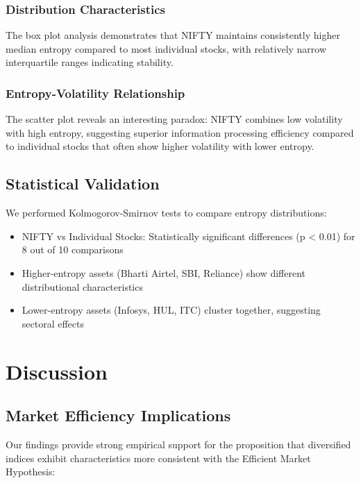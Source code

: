 \documentclass[12pt,a4paper]{article}
\begin{document}
\subsubsection{Distribution Characteristics}

The box plot analysis demonstrates that NIFTY maintains consistently higher median entropy compared to most individual stocks, with relatively narrow interquartile ranges indicating stability.

\subsubsection{Entropy-Volatility Relationship}

The scatter plot reveals an interesting paradox: NIFTY combines low volatility with high entropy, suggesting superior information processing efficiency compared to individual stocks that often show higher volatility with lower entropy.

\subsection{Statistical Validation}

We performed Kolmogorov-Smirnov tests to compare entropy distributions:

\begin{itemize}
    \item NIFTY vs Individual Stocks: Statistically significant differences (p < 0.01) for 8 out of 10 comparisons
    \item Higher-entropy assets (Bharti Airtel, SBI, Reliance) show different distributional characteristics
    \item Lower-entropy assets (Infosys, HUL, ITC) cluster together, suggesting sectoral effects
\end{itemize}

\section{Discussion}

\subsection{Market Efficiency Implications}

Our findings provide strong empirical support for the proposition that diversified indices exhibit characteristics more consistent with the Efficient Market Hypothesis:
\end{document}
